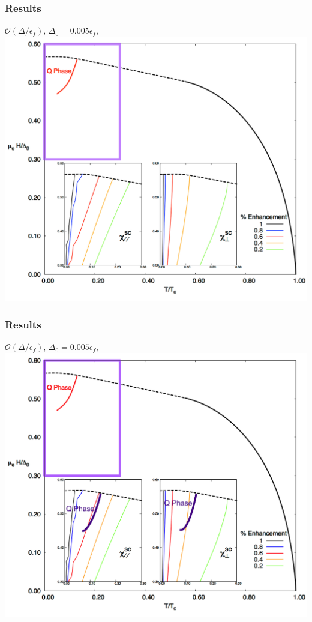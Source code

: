 \documentclass{beamer}
\newcommand\Fontvi{\fontsize{9}{9}\selectfont}
\begin{document}
\begin{frame}\frametitle{Results}
 {\Fontvi $\mathcal{O}(\Delta/\epsilon_f)$}, $\Delta_0=0.005\epsilon_f$,\\
\includegraphics[height=0.6\textwidth,width=\textwidth]{maxsus_diagram.pdf}
\end{frame}
\begin{frame}\frametitle{Results}
 {\Fontvi $\mathcal{O}(\Delta/\epsilon_f)$}, $\Delta_0=0.005\epsilon_f$,\\
\includegraphics[height=0.6\textwidth,width=\textwidth]{maxsus_diagram2.jpg}
\end{frame}
\end{document}
